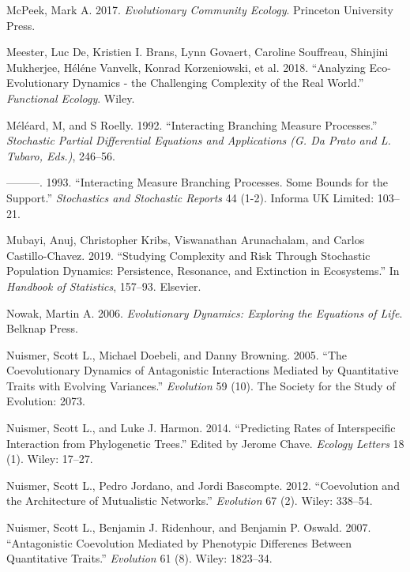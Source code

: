\documentclass[]{article}
\begin{document}
\leavevmode\hypertarget{ref-markmcpeek2017}{}%
McPeek, Mark A. 2017. \emph{Evolutionary Community Ecology}. Princeton
University Press.

\leavevmode\hypertarget{ref-DeMeester2018}{}%
Meester, Luc De, Kristien I. Brans, Lynn Govaert, Caroline Souffreau,
Shinjini Mukherjee, Héléne Vanvelk, Konrad Korzeniowski, et al. 2018.
``Analyzing Eco-Evolutionary Dynamics - the Challenging Complexity of
the Real World.'' \emph{Functional Ecology}. Wiley.

\leavevmode\hypertarget{ref-meleard1992interacting}{}%
Méléard, M, and S Roelly. 1992. ``Interacting Branching Measure
Processes.'' \emph{Stochastic Partial Differential Equations and
Applications (G. Da Prato and L. Tubaro, Eds.)}, 246--56.

\leavevmode\hypertarget{ref-Mlard1993}{}%
---------. 1993. ``Interacting Measure Branching Processes. Some Bounds
for the Support.'' \emph{Stochastics and Stochastic Reports} 44 (1-2).
Informa UK Limited: 103--21.

\leavevmode\hypertarget{ref-Mubayi2019}{}%
Mubayi, Anuj, Christopher Kribs, Viswanathan Arunachalam, and Carlos
Castillo-Chavez. 2019. ``Studying Complexity and Risk Through Stochastic
Population Dynamics: Persistence, Resonance, and Extinction in
Ecosystems.'' In \emph{Handbook of Statistics}, 157--93. Elsevier.

\leavevmode\hypertarget{ref-9780674023383}{}%
Nowak, Martin A. 2006. \emph{Evolutionary Dynamics: Exploring the
Equations of Life}. Belknap Press.

\leavevmode\hypertarget{ref-Nuismer2005}{}%
Nuismer, Scott L., Michael Doebeli, and Danny Browning. 2005. ``The
Coevolutionary Dynamics of Antagonistic Interactions Mediated by
Quantitative Traits with Evolving Variances.'' \emph{Evolution} 59 (10).
The Society for the Study of Evolution: 2073.

\leavevmode\hypertarget{ref-Nuismer2014}{}%
Nuismer, Scott L., and Luke J. Harmon. 2014. ``Predicting Rates of
Interspecific Interaction from Phylogenetic Trees.'' Edited by Jerome
Chave. \emph{Ecology Letters} 18 (1). Wiley: 17--27.

\leavevmode\hypertarget{ref-Nuismer2012}{}%
Nuismer, Scott L., Pedro Jordano, and Jordi Bascompte. 2012.
``Coevolution and the Architecture of Mutualistic Networks.''
\emph{Evolution} 67 (2). Wiley: 338--54.

\leavevmode\hypertarget{ref-Nuismer2007}{}%
Nuismer, Scott L., Benjamin J. Ridenhour, and Benjamin P. Oswald. 2007.
``Antagonistic Coevolution Mediated by Phenotypic Differenes Between
Quantitative Traits.'' \emph{Evolution} 61 (8). Wiley: 1823--34.
\end{document}
